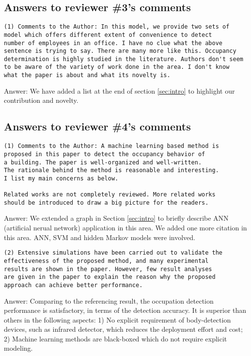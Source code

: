 \subsection{Answers to reviewer \#3's comments}
\begin{verbatim}
(1) Comments to the Author: In this model, we provide two sets of
model which offers different extent of convenience to detect
number of employees in an office. I have no clue what the above
sentence is trying to say. There are many more like this. Occupancy
determination is highly studied in the literature. Authors don't seem
to be aware of the variety of work done in the area. I don't know
what the paper is about and what its novelty is.
\end{verbatim}

Answer: We have added a list at the end of section \ref{sec:intro} to
highlight our contribution and novelty.

\subsection{Answers to reviewer \#4's comments}
\begin{verbatim}
(1) Comments to the Author: A machine learning based method is
proposed in this paper to detect the occupancy behavior of
a building. The paper is well-organized and well-written.
The rationale behind the method is reasonable and interesting.
I list my main concerns as below.

Related works are not completely reviewed. More related works
should be introduced to draw a big picture for the readers.
\end{verbatim}

Answer: We extended a graph in Section \ref{sec:intro} to briefly describe
ANN (artificial nerual network) application in this area. We added one more
citation in this area. ANN, SVM and hidden Markov models were involved.


\begin{verbatim}
(2) Extensive simulations have been carried out to validate the
effectiveness of the proposed method, and many experimental
results are shown in the paper. However, few result analyses
are given in the paper to explain the reason why the proposed
approach can achieve better performance.
\end{verbatim}

Answer: Comparing to the referencing result, the occupation detection performance is
satisfactory, in terms of the detection accuracy. It is superior than others
in the following aspects: 1) No explicit requirement of body-detection
devices, such as infrared detector, which reduces the deployment effort and
cost; 2) Machine learning methods are black-boxed which do not require
explicit modeling.

